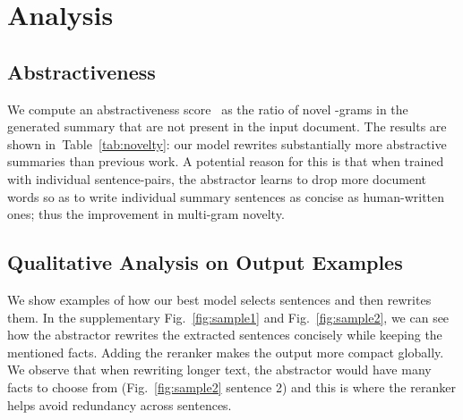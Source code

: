 \documentclass[11pt,a4paper]{article}
\def\figref#1{Fig.~\ref{#1}}
\def\tabref#1{Table~\ref{#1}}
\begin{document}
\begin{table}[t]
\centering
{}
\vspace{-10pt}
\caption{
Abstractiveness: novel -gram counts.
}
\label{tab:novelty}
\vspace{-10pt}
\end{table}

\section{Analysis}

\subsection{Abstractiveness}
We compute an abstractiveness score~\cite{get_to_the_point}
as the ratio of novel -grams in the generated summary that are not present
in the input document. The results are shown in~\tabref{tab:novelty}: our model rewrites substantially more abstractive summaries than previous work.
A potential reason for this is that when trained with individual sentence-pairs, the abstractor learns to drop more document words so as to write individual summary sentences as concise as human-written ones; thus the improvement in multi-gram novelty.




\subsection{Qualitative Analysis on Output Examples}
\label{sec:qualitative}

We show examples of how our best model selects sentences and then rewrites them.
In the supplementary \figref{fig:sample1} and \figref{fig:sample2}, we can see how the abstractor rewrites the extracted sentences concisely while keeping the mentioned facts.
Adding the reranker makes the output more compact globally.
We observe that when rewriting longer text, the abstractor would have many facts to choose from (\figref{fig:sample2} sentence 2) and
this is where the reranker helps avoid redundancy across sentences.
\end{document}
